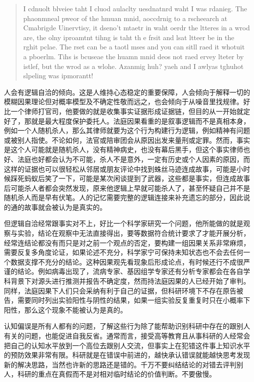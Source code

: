 \documentclass[]{tufte-book}
\begin{document}
\begin{quote}
I cdnuolt blveiee taht I cluod aulaclty uesdnatnrd waht I was rdanieg. The phaonmneal pweor of the hmuan mnid, aoccdrnig to a rscheearch at Cmabrigde Uinervtisy, it dseno't mtaetr in waht oerdr the ltteres in a wrod are, the olny iproamtnt tihng is taht th e frsit and lsat ltteer be in the rghit pclae. The rset can be a taotl mses and you can sitll raed it whotuit a pboerlm. Tihs is bcuseae the huamn mnid deos not raed ervey lteter by istlef, but the wrod as a wlohe. Azanmig huh? yaeh and I awlyas tghuhot slpeling was ipmorantt!
\end{quote}

人会有逻辑自洽的倾向。这是人维持心态稳定的重要保障，人会倾向于解释一切的模糊因果理论但对概率模型及不确定性敬而远之，也会倾向于从噪音里找规律。好比一个律师打官司，他要做的就是收集事实证据形成证据链，但目的从一开始就定好了，那就是最大程度保护委托人。法庭因果看重的是叙事逻辑而不是真相本身，例如一个人随机杀人，那么其律师就要为这个行为构建行为逻辑，例如精神有问题或被别人指使。不论如何，法官或陪审团会从原因出发来量刑或定罪。然而，事实是这个人可能就是随机杀人，没有精神病史，也没有幕后黑手，但这个事实律师也好、法庭也好都会认为不可能，杀人不是意外，一定有历史或个人因素的原因，而这样的证据也可以很轻松从邻居或朋友评论中找到蛛丝马迹连成故事，可能是小时候踩死蚂蚁后笑了一下，可能是某次闲谈提到了武器，这些都是事实，但连成故事后可能杀人者都会突然发现，原来他逻辑上早就可能杀人了，甚至怀疑自己并不是随机杀人而是早有伏笔。人的记忆需要完整的逻辑连接来补充遗忘的部分，因此说的通的故事就会被认为是真实的。

但逻辑自洽经常跟事实对不上，好比一个科学家研究一个问题，他所能做的就是观察与实验，结论在观察中无法直接得出，要等数据符合统计要求了才能开展分析，经常连结论都没有而只是对之前一个观点的否定，要构建一组因果关系非常麻烦，需要反复多角度论证，如果论述不充分，科学家宁可保持未知状态也不会去任何一个数据支撑不充分的结论。这种因果观先看现象后形成论点，有时候还行不成很严谨的结论。例如病毒出现了，流病专家、基因组学专家还有分析专家都会在各自学科背景下对源头进行推测并报告不确定度，然而持法庭因果的人已经开始了审判。同样，法庭因果下人们只会采纳有利于自己的证据，但科研环境下不存在原告被告，需要同时列出实验阳性与阴性的结果，如果一组实验反复重复时只在小概率下阳性，那么这个现象不能被认为是真的。

认知偏误是所有人都有的问题，了解这些行为除了能帮助识别科研中存在的跟别人有关的问题，也能促进自我反省。通常而言，接受高等教育且从事科研的人经常会把自己的认知水平放到一个高位去跟别人交流，但事实上在犯错这件事上知识水平的预防效果非常有限。科研就是在错误中前进的，越快承认错误就能越快思考发现新的解决思路，当然也许新的思路还是错的。千万不要纠结结论的对错去评判别人，科研的重点在真假而不是对相对临时结论的价值判断。不要傲慢。
\end{document}
